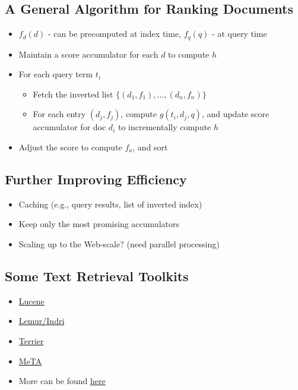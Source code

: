 \subsection{A General Algorithm for Ranking Documents}
\begin{itemize}
\item $f_d(d)$ - can be precomputed at index time, $f_q(q)$ - at query time
\item Maintain a score accumulator for each $d$ to compute $h$

\item For each query term $t_i$
\begin{itemize}
\item Fetch the inverted list $\{(d_1,f_1),\dots ,(d_n,f_n)\}$
\item For each entry $(d_j,f_j)$, compute $g(t_i,d_j,q)$, and update score accumulator for doc $d_i$ to incrementally compute $h$
\end{itemize}
\item Adjust the score to compute $f_a$, and sort
\end{itemize}


\subsection{Further Improving Efficiency}
\begin{itemize}
\item Caching (e.g., query results, list of inverted index)
\item Keep only the most promising accumulators
\item Scaling up to the Web-scale? (need parallel processing)
\end{itemize}


\subsection{Some Text Retrieval Toolkits}
\begin{itemize}
\item \href{http://lucene.apache.org/}{Lucene}
\item \href{http://www.lemurproject.org/}{Lemur/Indri}
\item \href{http://terrier.org/}{Terrier}
\item \href{http://meta-toolkit.github.io/meta/}{MeTA}
\item More can be found \href{http://timan.cs.uiuc.edu/resources}{here}
\end{itemize}


